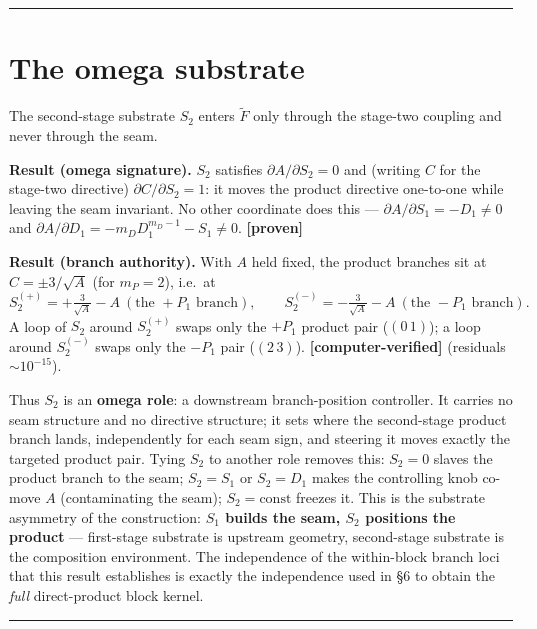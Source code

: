 \documentclass[11pt]{article}
\theoremstyle{plain}
\theoremstyle{definition}
\theoremstyle{remark}
\begin{document}
\begin{center}\rule{0.5\linewidth}{0.5pt}\end{center}

\hypertarget{the-omega-substrate}{%
\section{The omega substrate}\label{the-omega-substrate}}

The second-stage substrate \(S_2\) enters \(\widetilde F\) only through the stage-two coupling and never through the seam.

\textbf{Result (omega signature).} \(S_2\) satisfies \(\partial A/\partial S_2 = 0\) and (writing \(C\) for the stage-two directive) \(\partial C/\partial S_2 = 1\): it moves the product directive one-to-one while leaving the seam invariant. No other coordinate does this --- \(\partial A/\partial S_1 = -D_1 \neq 0\) and \(\partial A/\partial D_1 = -m_D D_1^{m_D-1} - S_1 \neq 0\). \textbf{{[}proven{]}}

\textbf{Result (branch authority).} With \(A\) held fixed, the product branches sit at \(C = \pm 3/\sqrt A\) (for \(m_P=2\)), i.e.~at \[
S_2^{(+)} = +\tfrac{3}{\sqrt A} - A \ (\text{the }{+}P_1\text{ branch}),\qquad S_2^{(-)} = -\tfrac{3}{\sqrt A} - A \ (\text{the }{-}P_1\text{ branch}).
\] A loop of \(S_2\) around \(S_2^{(+)}\) swaps only the \(+P_1\) product pair (\((0\,1)\)); a loop around \(S_2^{(-)}\) swaps only the \(-P_1\) pair (\((2\,3)\)). \textbf{{[}computer-verified{]}} (residuals \(\sim 10^{-15}\)).

Thus \(S_2\) is an \textbf{omega role}: a downstream branch-position controller. It carries no seam structure and no directive structure; it sets where the second-stage product branch lands, independently for each seam sign, and steering it moves exactly the targeted product pair. Tying \(S_2\) to another role removes this: \(S_2 = 0\) slaves the product branch to the seam; \(S_2 = S_1\) or \(S_2 = D_1\) makes the controlling knob co-move \(A\) (contaminating the seam); \(S_2 = \text{const}\) freezes it. This is the substrate asymmetry of the construction: \textbf{\(S_1\) builds the seam, \(S_2\) positions the product} --- first-stage substrate is upstream geometry, second-stage substrate is the composition environment. The independence of the within-block branch loci that this result establishes is exactly the independence used in §6 to obtain the \emph{full} direct-product block kernel.

\begin{center}\rule{0.5\linewidth}{0.5pt}\end{center}
\end{document}
